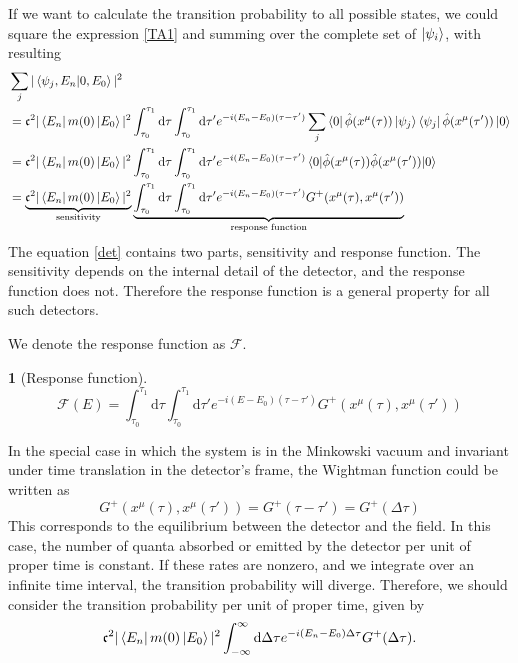 \documentclass[12pt]{article}
\numberwithin{equation}{section}
\theoremstyle{1style}
\newtheorem{cthm}[equation]{}
\newcommand{\id}{\mathrm{d}}
\begin{document}
If we want to calculate the transition probability to all possible states, we could square the expression \ref{TA1} and
summing over the complete set of \(\ket{\psi_i}\), with resulting
\begin{align}
   & \sum_{j}|\braket{\psi_j,E_n}{0,E_0}|^2                                                                                                                   \\
   & =\mathfrak{c}^2|\bra{E_n}m(0)\ket{E_0}|^2\int_{\tau_0}^{\tau_1}\id \tau
  \int_{\tau_0}^{\tau_1}\id \tau'e^{-i(E_n-E_0)(\tau-\tau')}\sum_{j}\bra{0}\hat{\phi}(x^{\mu}(\tau))\ket{\psi_j}\bra{\psi_j}\hat{\phi}(x^{\mu}(\tau'))\ket{0} \\
   & =\mathfrak{c}^2|\bra{E_n}m(0)\ket{E_0}|^2\int_{\tau_0}^{\tau_1}\id \tau
  \int_{\tau_0}^{\tau_1}\id \tau'e^{-i(E_n-E_0)(\tau-\tau')}\expval{\hat{\phi}(x^{\mu}(\tau))\hat{\phi}(x^{\mu}(\tau'))}{0}                                   \\
   & =\underbrace{\mathfrak{c}^2|\bra{E_n}m(0)\ket{E_0}|^2}_{\text{sensitivity}}\underbrace{\int_{\tau_0}^{\tau_1}\id \tau
  \int_{\tau_0}^{\tau_1}\id \tau'e^{-i(E_n-E_0)(\tau-\tau')}G^+(x^{\mu}(\tau),x^{\mu}(\tau'))}_{\text{response function}}\label{det}
\end{align}
The equation \ref{det} contains two parts, sensitivity and response function.
The sensitivity depends on the internal detail of the detector, and the response function does not.
Therefore the response function is a general property for all such detectors.

We denote the response function as \(\mathcal{F}\).
\begin{cthm}[Response function]
  \[\mathcal{F}(E)=\int_{\tau_0}^{\tau_1}\id \tau\int_{\tau_0}^{\tau_1}\id \tau'e^{-i(E-E_0)(\tau-\tau')}G^+(x^{\mu}(\tau),x^{\mu}(\tau')) \]
\end{cthm}
In the special case in which the system is in the Minkowski  vacuum and invariant under time translation in the detector's frame, the Wightman function could be written as
\begin{equation}
  G^+(x^{\mu}(\tau),x^{\mu}(\tau'))=G^+(\tau-\tau')=G^+(\Delta \tau)
\end{equation}
This corresponds to the equilibrium between the detector and the field.
In this case, the number of quanta absorbed or emitted by the detector per unit of proper time is constant.
If these rates are nonzero, and we integrate over an infinite time interval, the transition probability will diverge.
Therefore, we should consider the transition probability per unit of proper time, given by
\begin{equation}
  \mathfrak{c}^2|\bra{E_n}m(0)\ket{E_0}|^2\int_{-\infty}^{\infty}\id \Delta\tau e^{-i(E_n-E_0)\Delta \tau}G^+(\Delta \tau).
\end{equation}
\end{document}
